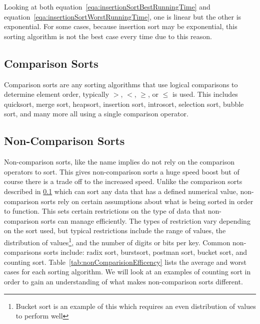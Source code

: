 \documentclass[12pt]{article}
\begin{document}
	Looking at both equation~\ref{eqa:insertionSortBestRunningTime} and equation~\ref{eqa:insertionSortWorstRunningTime}, one is linear but the other is exponential.
	For some cases, because insertion sort may be exponential, this sorting algorithm is not the best case every time due to this reason.
	
	\subsection{Comparison Sorts}
	\label{CompSort}
	Comparison sorts are any sorting algorithms that use logical comparisons to determine element order, typically $>$, $<$, $\ge$, or $\le$ is used.
	This includes quicksort, merge sort, heapsort, insertion sort, introsort, selection sort, bubble sort, and many more all using a single comparison operator.
	
	
	
	
	\subsection{Non-Comparison Sorts}
	
	Non-comparison sorts, like the name implies do not rely on the comparison operators to sort\cite[p.~191]{intro}.
	This gives non-comparison sorts a huge speed boost but of course there is a trade off to the increased speed.
	Unlike the comparison sorts described in \ref{CompSort} which can sort any data that has a defined numerical value, non-comparison sorts rely on certain assumptions about what is being sorted in order to function.
	This sets certain restrictions on the type of data that non-comparison sorts can manage efficiently.
	The types of restriction vary depending on the sort used, but typical restrictions include the range of values, the distribution of values\footnote{Bucket sort is an example of this which requires an even distribution of values to perform well}, and the number of digits or bits per key\cite{wiki-sortingAlgorithm}.
	Common non-comparisons sorts include: radix sort, burstsort, postman sort, bucket sort, and counting sort.
	Table~\ref{tab:nonComparisionEfficency} lists the average and worst cases for each sorting algorithm.
	We will look at an examples of counting sort in order to gain an understanding of what makes non-comparison sorts different.

	
\end{document}
